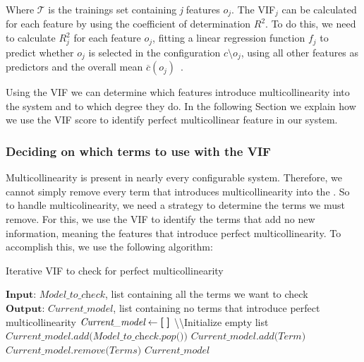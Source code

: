 Where $\mathcal{T}$ is the trainings set containing \textit{j} features $o_j$. The VIF$_{j}$ can be calculated for each feature by using the coefficient
of determination $R^2$. To do this, we need to calculate $R^{2}_j$ for each feature $o_j$, fitting a linear regression function $f_j$ to predict whether $o_j$
is selected in the configuration $c \setminus o_j$, using all other features as predictors and the overall mean $\overline{c}(o_j)$~\cite{Multicollinearity}.

Using the \acs{VIF} we can determine which features introduce multicollinearity into the system and to which degree they do. In the following Section we 
explain how we use the \acs{VIF} score to identify perfect multicollinear feature in our system.

\subsubsection{Deciding on which terms to use with the VIF}\label{ch:iterative-vif}
Multicollinearity is present in nearly every configurable system. 
Therefore, we cannot simply remove every term that introduces multicollinearity into the {\perfInfluenceModel}. 
So to handle multicolinearity, we need a strategy to determine the terms we must remove. 
For this, we use the \acs{VIF} to identify the terms that add no new information, 
meaning the features that introduce perfect multicollinearity. To accomplish this, we use the following algorithm:

\begin{algorithm}
    \caption{Iterative VIF to check for perfect multicollinearity}\label{alg:vif_iterative}
    \begin{algorithmic}[1]
    \State $\textbf{Input: } \textit{Model\_to\_check}$, list containing all the terms we want to check 
    \State $\textbf{Output: } \textit{Current\_model}$, list containing no terms that introduce perfect multicollinearity
    \State $\textit{Current\_model} \gets \textbf{[\;]}$ \textbackslash\textbackslash Initialize empty list
    \State $\textit{Current\_model.add(Model\_to\_check.pop())} $ \label{alg:vif_add_item}
        \State $\textit{Current\_model.add(Term)}$
        \label{alg:vif_check} \\    
            \qquad$\textit{Current\_model.remove(Terms)}$ 
        \EndIf
    \EndFor
    \State\Return $\textit{Current\_model}$

    \end{algorithmic}
\end{algorithm}

